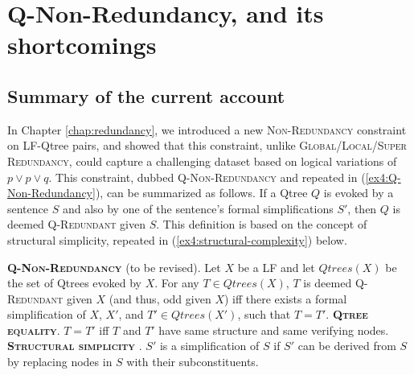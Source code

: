 %

 


\section[Q-Non-Redundancy]{Q-Non-Redundancy, and its shortcomings}\label{sec5:q-non-redundancy}

\subsection{Summary of the current account}

In Chapter \ref{chap:redundancy}, we introduced a new \textsc{Non-Redundancy} constraint on LF-Qtree pairs, and showed that this constraint, unlike \textsc{Global/Local/Super Redundancy}, could capture a challenging dataset based on logical variations of $p \vee p \vee q$. This constraint, dubbed \textsc{Q-Non-Redundancy} and repeated in (\ref{ex4:Q-Non-Redundancy}), can be summarized as follows. If a Qtree $Q$ is evoked by a sentence $S$ and also by one of the sentence's formal simplifications $S'$, then $Q$ is deemed \textsc{Q-Redundant} given $S$. This definition is based on the concept of structural simplicity, repeated in (\ref{ex4:structural-complexity}) below.

\begin{exe}
	 {\textsc{\textbf{Q-Non-Redundancy}} (to be revised). Let $X$ be a LF and let $Qtrees(X)$ be the set of Qtrees evoked by $X$. For any $T \in Qtrees(X)$, $T$ is deemed \textsc{Q-Redundant} given $X$ (and thus, odd given $X$) iff there exists a formal simplification of $X$, $X'$, and $T' \in Qtrees(X')$, such that $T=T'$.}
	 {\textsc{\textbf{Qtree equality}}. $T = T'$ iff $T$ and $T'$ have same structure and same verifying nodes.}
	 {\textsc{\textbf{Structural simplicity}} \citep{Katzir2007}. $S'$ is a simplification of $S$ if $S'$ can be derived from $S$ by replacing nodes in $S$ with their subconstituents.}
\end{exe}

